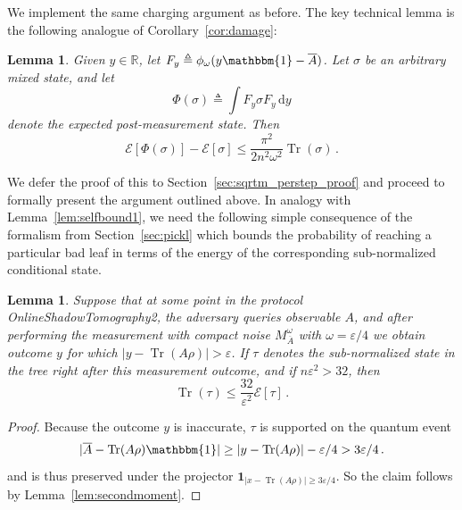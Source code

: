\documentclass[10pt]{article}
\renewcommand{\epsilon}{\varepsilon}
\newcommand{\energy}{\mathcal{E}}
\newcommand{\luders}{\Phi}
\DeclareMathOperator{\Tr}{Tr}
\newcommand{\Id}{\mathbbm{1}}
\newtheorem{lemma}[theorem]{Lemma}
\newcommand{\ryan}[1]{{\color{purple}[ryan: #1]}}
\renewcommand{\ryan}[1]{}
\newcommand{\lift}[1]{\overline{#1}}
\begin{document}
We implement the same charging argument as before. The key technical lemma is the following analogue of Corollary~\ref{cor:damage}:

\begin{lemma}\label{lem:sqrtm_perstep}
    Given $y\in\mathbb{R}$, let $F_y\triangleq \phi_\omega(y\Id - \lift{A})$. Let $\sigma$ be an arbitrary mixed state, and let
    \begin{equation}
        \luders(\sigma) \triangleq \int F_y \sigma F_y\,\mathrm{d}y
    \end{equation}
    denote the expected post-measurement state. Then
    \begin{equation}
        \energy[\luders(\sigma)] - \energy[\sigma] \le \frac{\pi^2}{2n^2\omega^2}\Tr(\sigma)\,.
    \end{equation}
\end{lemma}

\noindent We defer the proof of this to Section~\ref{sec:sqrtm_perstep_proof} and proceed to formally present the argument outlined above. In analogy with Lemma~\ref{lem:selfbound1}, we need the following simple consequence of the formalism from Section~\ref{sec:pickl} which bounds the probability of reaching a particular bad leaf in terms of the energy of the corresponding sub-normalized conditional state.

\begin{lemma}\label{lem:selfbound2}
    Suppose that at some point in the protocol {\sc OnlineShadowTomography2}, the adversary queries observable $A$, and after performing the measurement with compact noise $M^\omega_{\lift{A}}$ with $\omega = \epsilon/4$ we obtain outcome $y$ for which $|y - \Tr(A\rho)| > \epsilon$. If $\tau$ denotes the sub-normalized state in the tree right after this measurement outcome, and if $n\epsilon^2 > 32$, then
    \begin{equation}
        \Tr(\tau) \le \frac{32}{\epsilon^2}\energy[\tau]\,.
    \end{equation}
\end{lemma}

\begin{proof}
    Because the outcome $y$ is inaccurate, $\tau$ is supported on the quantum event
    \begin{equation}
        |\lift{A} - \Tr(A\rho)\Id| \ge |y - \Tr(A\rho)| - \epsilon/4 > 3\epsilon/4\,.
    \end{equation}
    and is thus preserved under the projector $\mathbf{1}_{|x - \Tr(A\rho)| \ge 3\epsilon/4}$. So the claim follows by Lemma~\ref{lem:secondmoment}.
\end{proof}
\end{document}
